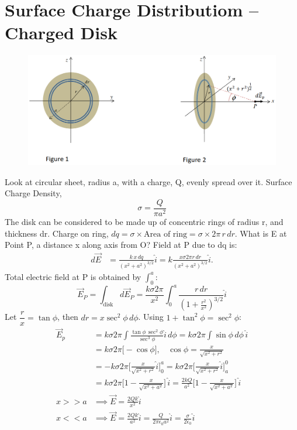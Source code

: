\documentclass[a4paper, 11pt, normalem]{report}
\begin{document}
\section{Surface Charge Distributiom -- Charged Disk}
\begin{figure}[H]
    \centering
    \includegraphics[scale=0.4]{R1.png}
\end{figure}
Look at circular sheet, radius a, with a charge, Q, evenly spread over it.
Surface Charge Density, 
\begin{equation}
    \sigma = \dfrac{Q}{\pi a^{2}}
\end{equation}
The disk can be considered to be made up of concentric rings of radius r, and thickness dr.
Charge on ring, $dq = \sigma \times \text{Area of ring} = \sigma \times 2\pi \, r \, dr$.
What is E at Point P, a distance x along axis from O?
Field at P due to dq is:
\begin{align}
    d\vec{E} &= \frac{k \, x \, dq}{(x^{2} + a^{2})^{3/2}} \hat{i} = k \frac{x \sigma 2\pi r \, dr}{(x^{2} + a^{2})^{3/2}} \hat{i}.
\end{align}
Total electric field at P is obtained by $\int_{0}^{a}$:
\begin{equation}
    \vec{E}_{P} = \int_{\text{disk}} d\vec{E}_{P} = \frac{k \sigma 2\pi}{x^{2}} \int_{0}^{a} \frac{r \, dr}{(1 + \tfrac{r^{2}}{x^{2}})^{3/2}} \hat{i}
\end{equation}
Let $\dfrac{r}{x} = \tan\phi$, then $dr = x\sec^{2}\phi \, d\phi$.
Using $1 + \tan^{2}\phi = \sec^{2}\phi$:
\begin{align}
    \vec{E}_p &= k \sigma 2\pi \int \frac{\tan\phi \, \sec^{2}\phi}{\sec^{3}\phi} \hat{i} \, d\phi = k \sigma 2\pi \int \sin\phi \, d\phi \, \hat{i} \\
              &= k \sigma 2\pi \big[-\cos\phi \big], ~~~~ \cos\phi = \frac{x}{\sqrt{x^{2} + r^{2}}} \\
              &= -k \sigma 2\pi \Big[\frac{x}{\sqrt{x^{2} + r^{2}}} \hat{i} \Big]_{0}^{a} = k \sigma 2\pi \Big[\frac{x}{\sqrt{x^{2} + r^{2}}} \hat{i} \Big]_{a}^{0} \\
              &= k \sigma 2\pi \Big[1 - \frac{x}{\sqrt{x^{2} + a^{2}}} \Big] \, \hat{i} = \frac{2 k Q}{a^{2}} \Big[1 - \frac{x}{\sqrt{x^{2} + a^{2}}} \Big] \, \hat{i}\\
    x >> a &\implies \vec{E} = \frac{2Qk}{x^{2}} \hat{i} \\
    x << a &\implies \vec{E} = \frac{2Qk}{a^{2}} \hat{i} = \frac{Q}{2\pi \epsilon_{0} a^{2}} \hat{i} = \frac{\sigma}{2\epsilon_{0}} \hat{i}
\end{align}
\end{document}
